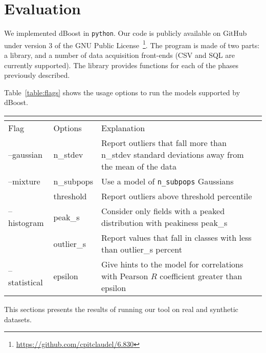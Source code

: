 \section{Evaluation}
\label{sec:evaluation}

We implemented dBoost in \texttt{python}. Our code is publicly available on GitHub under version 3 of the GNU Public License~\footnote{\url{https://github.com/cpitclaudel/6.830}}. The program is made of two parts: a library, and a number of data acquisition front-ends (CSV and SQL are currently supported). The library provides functions for each of the phases previously described.

Table~\ref{table:flags} shows the usage options to run the models supported by dBoost. 


\begin{table*}
  \renewcommand{\arraystretch}{1.2}
  \setlength\tabcolsep{3\tabcolsep}

  \label{table:flags}
  \caption{dBoost command line usage.}
  \centering
  \begin{tabular} { l | l | p{10cm} }
    \multicolumn{3}{l}{} \\
    \hline
    Flag & Options & Explanation \\
    \hline
    --gaussian & n\_stdev & Report outliers that fall more than n\_stdev standard deviations away from the mean of the data \\
    --mixture & n\_subpops & Use a model of \texttt{n\_subpops} Gaussians \\
         & threshold & Report outliers above threshold percentile \\
    --histogram & peak\_s & Consider only fields with a peaked distribution with peakiness peak\_s \\
         & outlier\_s & Report values that fall in classes with less than outlier\_s percent \\
    --statistical & epsilon & Give hints to the model for correlations with Pearson $R$ coefficient greater than epsilon \\
  \end{tabular}
\end{table*}

This sections presents the results of running our tool on real and synthetic datasets.

